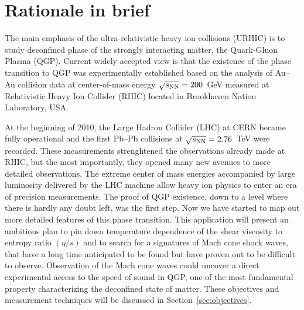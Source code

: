 

\section{Rationale in brief}%
\label{sec:rationale}
The main emphasis of the ultra-relativistic heavy ion collisions (URHIC) is to study deconfined phase of the strongly interacting matter, the Quark-Gluon Plasma (QGP). Current widely accepted view is that the existence of the phase transition to QGP was experimentally established based on the analysis of  Au--Au collision data at center-of-mass energy $\sqrt{s_{\rm NN}}=200$~GeV measured at Relativistic Heavy Ion Collider (RHIC) located in Brookhaven Nation Laboratory, USA.

At the beginning of 2010, the Large Hadron Collider (LHC) at CERN became fully operational and the first Pb--Pb collisions at $\sqrt{s_{\rm NN}}=2.76$~TeV were recorded.  These measurements strenghtened the observations already made at RHIC, but the most importantly, they opened many new avenues to more detailed observations. 
The extreme center of mass energies accompanied by large luminosity delivered by the LHC machine allow heavy ion physics to enter an era of precision measurements.  The proof of QGP existence, down to a level where there is hardly any doubt left, was the first step.  Now we have started to map out more detailed features of this phase transition. This application will present an ambitious plan to pin down temperature dependence of the shear viscosity to entropy ratio $(\eta/s)$ and to search for a signatures of Mach cone shock waves, that have a long time anticipated to be found but have proven out to be difficult to observe. Observation of the Mach cone waves could uncover a direct experimental access to the speed of sound in QGP, one of the most fundamental property characterizing the deconfined state of matter.  These objectives and measurement techniques will be discussed in Section~\ref{sec:objectives}.


